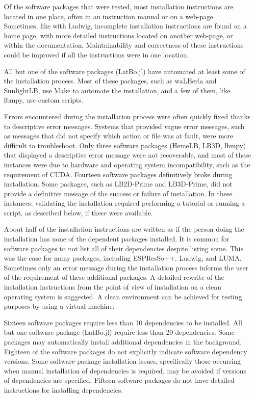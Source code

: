 \documentclass[12pt, notitlepage]{article}
\begin{document}
Of the software packages that were tested, most installation instructions are located in one place, often in an instruction manual or on a web-page. Sometimes, like with Ludwig, incomplete installation instructions are found on a home page, with more detailed instructions located on another web-page, or within the documentation. Maintainability and correctness of these instructions could be improved if all the instructions were in one location. 

All but one of the software packages (LatBo.jl) have automated at least some of the installation process. Most of these packages, such as waLBerla and SunlightLB, use Make to automate the installation, and a few of them, like lbmpy, use custom scripts.

Errors encountered during the installation process were often quickly fixed thanks to descriptive error messages. Systems that provided vague error messages, such as messages that did not specify which action or file was at fault, were more difficult to troubleshoot. Only three software packages (HemeLB, LB3D, lbmpy) that displayed a descriptive error message were not recoverable, and most of these instances were due to hardware and operating system incompatibility, such as the requirement of CUDA. Fourteen software packages definitively broke during installation. Some packages, such as LB2D-Prime and LB3D-Prime, did not provide a definitive message of the success or failure of installation. In these instances, validating the installation required performing a tutorial or running a script, as described below, if these were available. 

About half of the installation instructions are written as if the person doing the installation has none of the dependent packages installed. It is common for software packages to not list all of their dependencies despite listing some. This was the case for many packages, including ESPResSo++, Ludwig, and LUMA. Sometimes only an error message during the installation process informs the user of the requirement of these additional packages. A detailed rewrite of the installation instructions from the point of view of installation on a clean operating system is suggested. A clean environment can be achieved for testing purposes by using a virtual machine.

Sixteen software packages require less than 10 dependencies to be installed. All but one software package (LatBo.jl) require less than 20 dependencies. Some packages may automatically install additional dependencies in the background. Eighteen of the software packages do not explicitly indicate software dependency versions. Some software package installation issues, specifically those occurring when manual installation of dependencies is required, may be avoided if versions of dependencies are specified. Fifteen software packages do not have detailed instructions for installing dependencies. 
\end{document}

